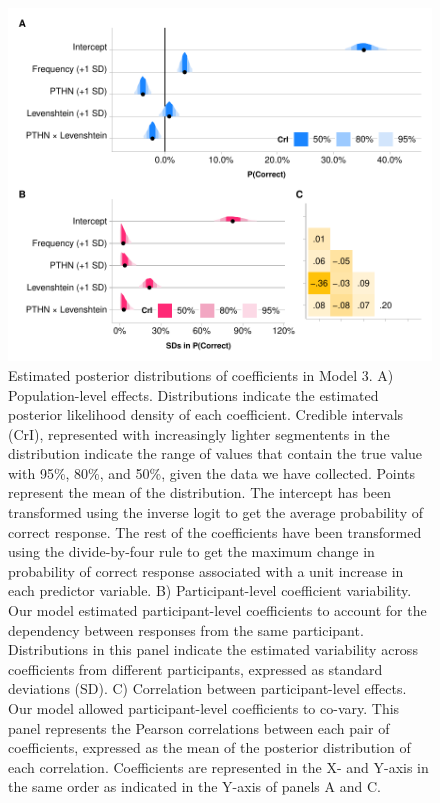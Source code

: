 \documentclass[
  man]{apa6}
\begin{document}
\begin{figure}
\centering
\includegraphics{manuscript_files/figure-latex/posterior_fix-1.pdf}
\caption{Estimated posterior distributions of coefficients in Model 3.
A) Population-level effects. Distributions indicate the estimated
posterior likelihood density of each coefficient. Credible intervals
(CrI), represented with increasingly lighter segmentents in the
distribution indicate the range of values that contain the true value
with 95\%, 80\%, and 50\%, given the data we have collected. Points
represent the mean of the distribution. The intercept has been
transformed using the inverse logit to get the average probability of
correct response. The rest of the coefficients have been transformed
using the divide-by-four rule to get the maximum change in probability
of correct response associated with a unit increase in each predictor
variable. B) Participant-level coefficient variability. Our model
estimated participant-level coefficients to account for the dependency
between responses from the same participant. Distributions in this panel
indicate the estimated variability across coefficients from different
participants, expressed as standard deviations (SD). C) Correlation
between participant-level effects. Our model allowed participant-level
coefficients to co-vary. This panel represents the Pearson correlations
between each pair of coefficients, expressed as the mean of the
posterior distribution of each correlation. Coefficients are represented
in the X- and Y-axis in the same order as indicated in the Y-axis of
panels A and C.}
\end{figure}
\end{document}
